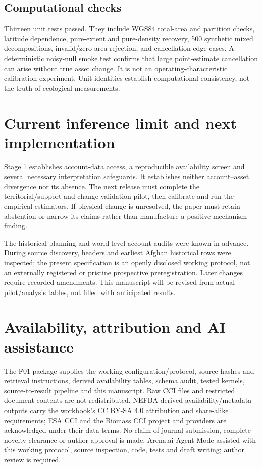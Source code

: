 \documentclass[11pt,a4paper]{article}
\begin{document}
\subsection{Computational checks}
Thirteen unit tests passed. They include WGS84 total-area and partition checks, latitude dependence, pure-extent and pure-density recovery, 500 synthetic mixed decompositions, invalid/zero-area rejection, and cancellation edge cases. A deterministic noisy-null smoke test confirms that large point-estimate cancellation can arise without true asset change. It is not an operating-characteristic calibration experiment. Unit identities establish computational consistency, not the truth of ecological measurements.

\section{Current inference limit and next implementation}
Stage 1 establishes account-data access, a reproducible availability screen and several necessary interpretation safeguards. It establishes neither account--asset divergence nor its absence. The next release must complete the territorial/support and change-validation pilot, then calibrate and run the empirical estimators. If physical change is unresolved, the paper must retain abstention or narrow its claims rather than manufacture a positive mechanism finding.

The historical planning and world-level account audits were known in advance. During source discovery, headers and earliest Afghan historical rows were inspected; the present specification is an openly disclosed working protocol, not an externally registered or pristine prospective preregistration. Later changes require recorded amendments. This manuscript will be revised from actual pilot/analysis tables, not filled with anticipated results.

\section*{Availability, attribution and AI assistance}
The F01 package supplies the working configuration/protocol, source hashes and retrieval instructions, derived availability tables, schema audit, tested kernels, source-to-result pipeline and this manuscript. Raw CCI files and restricted document contents are not redistributed. NEFBA-derived availability/metadata outputs carry the workbook's CC BY-SA 4.0 attribution and share-alike requirements; ESA CCI and the Biomass CCI project and providers are acknowledged under their data terms. No claim of journal submission, complete novelty clearance or author approval is made. Arena.ai Agent Mode assisted with this working protocol, source inspection, code, tests and draft writing; author review is required.
\end{document}
